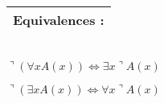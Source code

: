 \documentclass[a4]{article}
\begin{document}
\begin{tabular}[h]{l}

Equivalences :\\
\hline
\end{tabular}\\

\vspace{0.1cm}
$\urcorner (\forall x A(x)) \Leftrightarrow \exists x \urcorner A(x)$ 

$\urcorner (\exists x A(x)) \Leftrightarrow \forall x \urcorner A(x)$
\end{document}
